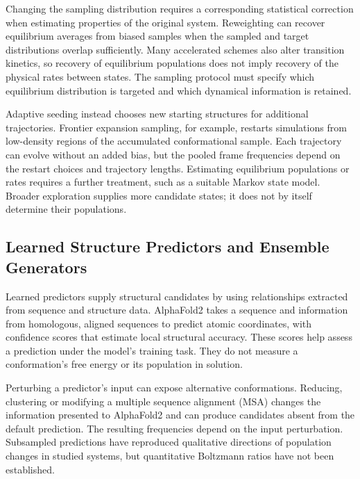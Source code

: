 Changing the sampling distribution requires a corresponding statistical correction when estimating properties of the original system. Reweighting can recover equilibrium averages from biased samples when the sampled and target distributions overlap sufficiently. Many accelerated schemes also alter transition kinetics, so recovery of equilibrium populations does not imply recovery of the physical rates between states.\supercite{heninEnhancedSamplingMethods2022} The sampling protocol must specify which equilibrium distribution is targeted and which dynamical information is retained.

Adaptive seeding instead chooses new starting structures for additional trajectories. Frontier expansion sampling, for example, restarts simulations from low-density regions of the accumulated conformational sample.\supercite{zhangFrontierExpansionSampling2020} Each trajectory can evolve without an added bias, but the pooled frame frequencies depend on the restart choices and trajectory lengths. Estimating equilibrium populations or rates requires a further treatment, such as a suitable Markov state model.\supercite{heninEnhancedSamplingMethods2022} Broader exploration supplies more candidate states; it does not by itself determine their populations.

\subsection{Learned Structure Predictors and Ensemble Generators}
\label{sec:bg-learned-generators}

Learned predictors supply structural candidates by using relationships extracted from sequence and structure data. AlphaFold2 takes a sequence and information from homologous, aligned sequences to predict atomic coordinates, with confidence scores that estimate local structural accuracy.\supercite{jumperHighlyAccurateProtein2021} These scores help assess a prediction under the model's training task. They do not measure a conformation's free energy or its population in solution.\supercite{wayment-steelePredictingMultipleConformations2024}

Perturbing a predictor's input can expose alternative conformations. Reducing, clustering or modifying a multiple sequence alignment (MSA) changes the information presented to AlphaFold2 and can produce candidates absent from the default prediction.\supercite{steinSPEACH_AFSamplingProtein2022,wayment-steelePredictingMultipleConformations2024} The resulting frequencies depend on the input perturbation. Subsampled predictions have reproduced qualitative directions of population changes in studied systems, but quantitative Boltzmann ratios have not been established.\supercite{monteirodasilvaHighthroughputPredictionProtein2024}


